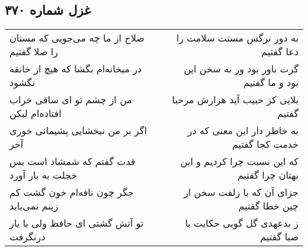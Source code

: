 \begin{center}
\section*{غزل شماره ۳۷۰}
\label{sec:sh370}
\begin{longtable}{l p{0.5cm} r}
صلاح از ما چه می‌جویی که مستان را صلا گفتیم
&&
به دور نرگس مستت سلامت را دعا گفتیم
\\
در میخانه‌ام بگشا که هیچ از خانقه نگشود
&&
گرت باور بود ور نه سخن این بود و ما گفتیم
\\
من از چشم تو ای ساقی خراب افتاده‌ام لیکن
&&
بلایی کز حبیب آید هزارش مرحبا گفتیم
\\
اگر بر من نبخشایی پشیمانی خوری آخر
&&
به خاطر دار این معنی که در خدمت کجا گفتیم
\\
قدت گفتم که شمشاد است بس خجلت به بار آورد
&&
که این نسبت چرا کردیم و این بهتان چرا گفتیم
\\
جگر چون نافه‌ام خون گشت کم زینم نمی‌باید
&&
جزای آن که با زلفت سخن از چین خطا گفتیم
\\
تو آتش گشتی ای حافظ ولی با یار درنگرفت
&&
ز بدعهدی گل گویی حکایت با صبا گفتیم
\\
\end{longtable}
\end{center}
